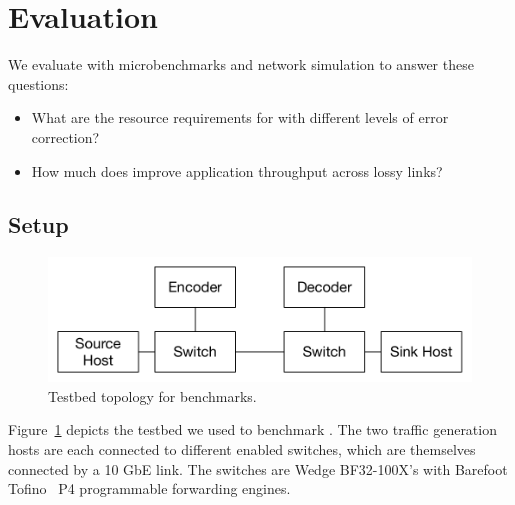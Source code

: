 \section{Evaluation}
\label{sec:evaluation}

We evaluate \OurSys with microbenchmarks and network simulation to answer these questions:
\begin{itemize}

\item What are the resource requirements for \OurSys with different levels of 
error correction?

\item How much does \OurSys improve application throughput across lossy links?

\end{itemize}

\subsection{Setup}
\begin{figure}
  \centering
  \includegraphics[width=0.3\paperwidth]{exp_topo.pdf}
  \caption{\label{fig:exp_topo} Testbed topology for benchmarks.}
\end{figure}

Figure~\ref{fig:exp_topo} depicts the testbed we used to benchmark \OurSys.
The two traffic generation hosts are each connected to different \OurSys
enabled switches, which are themselves connected by a 10 GbE link. The
switches are Wedge BF32-100X's with Barefoot Tofino~\cite{tofino} P4 
programmable forwarding engines. 



